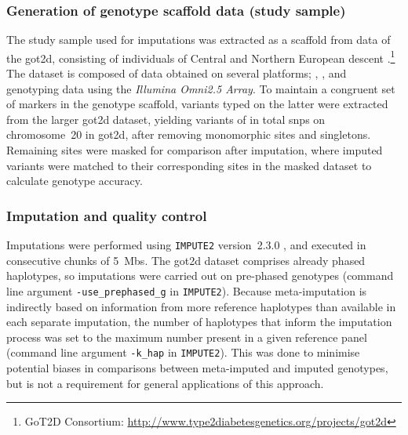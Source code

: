 %
\subsubsection{Generation of genotype scaffold data (study sample)}
%

The study sample used for imputations was extracted as a scaffold from data of the \gls{got2d}, consisting of  individuals of Central and Northern European descent \citep{Fuchsberger:2016df}.\footnote{GoT2D Consortium: \url{http://www.type2diabetesgenetics.org/projects/got2d} }
The dataset is composed of data obtained on several platforms;   ,   , and genotyping data using the \emph{Illumina Omni2.5 Array}.
To maintain a congruent set of markers in the genotype scaffold, variants typed on the latter were extracted from the larger \gls{got2d} dataset, yielding  variants of in total  \glspl{snp} on chromosome~20 in \gls{got2d}, after removing monomorphic sites and singletons.
Remaining sites were masked for comparison after imputation, where imputed variants were matched to their corresponding sites in the masked dataset to calculate genotype accuracy.

%

%



%
\subsubsection{Imputation and quality control}
\label{sec:meta_methods_imp}
%

Imputations were performed using \texttt{IMPUTE2} version~2.3.0 \citep{Howie:2009hq}, and executed in consecutive chunks of 5~\glspl{Mb}.
The \gls{got2d} dataset comprises already phased haplotypes, so imputations were carried out on pre-phased genotypes (command line argument \verb|-use_prephased_g| in \texttt{IMPUTE2}).
Because meta-imputation is indirectly based on information from more reference haplotypes than available in each separate imputation, the number of haplotypes that inform the imputation process was set to the maximum number present in a given reference panel (command line argument \verb|-k_hap| in \texttt{IMPUTE2}).
This was done to minimise potential biases in comparisons between meta-imputed and imputed genotypes, but is not a requirement for general applications of this approach.

